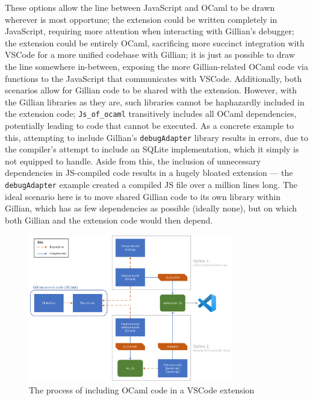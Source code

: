 These options allow the line between JavaScript and OCaml to be drawn wherever
is most opportune; the extension could be written completely in JavaScript,
requiring more attention when interacting with Gillian's debugger; the
extension could be entirely OCaml, sacrificing more succinct integration with
VSCode for a more unified codebase with Gillian; it is just as possible to draw
the line somewhere in-between, exposing the more Gillian-related OCaml code via
functions to the JavaScript that communicates with VSCode. Additionally, both
scenarios allow for Gillian code to be shared with the extension. However,
with the Gillian libraries as they are, such libraries cannot be haphazardly
included in the extension code; \texttt{Js\_of\_ocaml} transitively includes all
OCaml dependencies, potentially leading to code that cannot be executed. As a
concrete example to this, attempting to include Gillian's \texttt{debugAdapter}
library results in errors, due to the compiler's attempt to include an SQLite
implementation, which it simply is not equipped to handle. Aside from this, the
inclusion of unnecessary dependencies in JS-compiled code results in a hugely
bloated extension --- the \texttt{debugAdapter} example created a compiled JS
file over a million lines long. The ideal scenario here is to move shared
Gillian code to its own library within Gillian, which has as few dependencies as
possible (ideally none), but on which both Gillian and the extension code would
then depend.

\begin{figure}
  \center{}
  \includegraphics[width=0.8\textwidth]{img/vscode-extension-with-ocaml.png}
  \caption{The process of including OCaml code in a VSCode extension}%
  \label{fig:vscode-extension-with-ocaml}
\end{figure}

